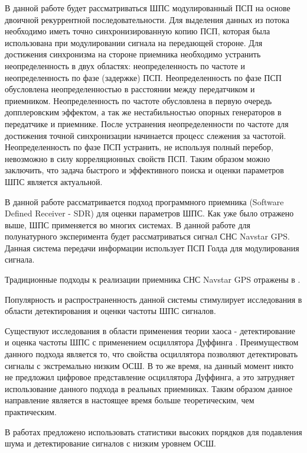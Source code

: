 В данной работе будет рассматриваться ШПС модулированный ПСП на основе двоичной рекуррентной последовательности.
Для выделения данных из потока необходимо иметь точно синхронизированную копию ПСП, которая была использована
при модулировании сигнала на передающей стороне. Для достижения синхронизма на стороне приемника необходимо
устранить неопределенность в двух областях: неопределенность по частоте и неопределенность по фазе (задержке) ПСП.
Неопределенность по фазе ПСП обусловлена неопределенностью в расстоянии между передатчиком и приемником. Неопределенность
по частоте обусловлена в первую очередь допплеровским эффектом, а так же нестабильностью опорных генераторов в
передатчике и приемнике. После устранения неопределенности по частоте для достижения точной синхронизации
начинается процесс слежения за частотой. Неопределенность по фазе ПСП устранить, не используя полный перебор,
невозможно в силу корреляционных свойств ПСП. Таким образом можно заключить, что задача быстрого и эффективного
поиска и оценки параметров ШПС является актуальной.

В данной работе рассматривается подход программного приемника (Software Defined Receiver - SDR)
\cite{akos-book, grayver-book, pany-book} для оценки параметров ШПС. Как уже было отражено выше, ШПС применяется во
многих системах. В данной работе для полунатурного эксперимента будет рассматриваться сигнал СНС Navstar GPS. Данная система передачи 
информации использует ПСП Голда \cite{gold-ieee} для модулирования сигнала.

Традиционные подходы к реализации приемника СНС Navstar GPS отражены в \cite{akos-book, tsui}. 

Популярность и распространенность данной системы стимулирует исследования в области детектирования
и оценки частоты ШПС сигналов.

Существуют исследования в области применения теории хаоса - детектирование и оценка
частоты ШПС с применением осциллятора Дуффинга \cite{chaos_cambridge, chaos_chen, chaos_huang, chaos_wang}. Преимуществом
данного подхода является то, что свойства осциллятора позволяют детектировать сигналы с экстремально низким ОСШ. В то же
время, на данный момент никто не предложил цифровое представление осциллятора Дуффинга, а это затрудняет использование данного подхода
в реальных приемниках. Таким образом данное направление является в настоящее время больше теоретическим, чем практическим.

В работах \cite{hos_petropulu, hos_zhao} предложено использовать статистики высоких порядков для подавления шума и детектирование
сигналов с низким уровнем ОСШ.

